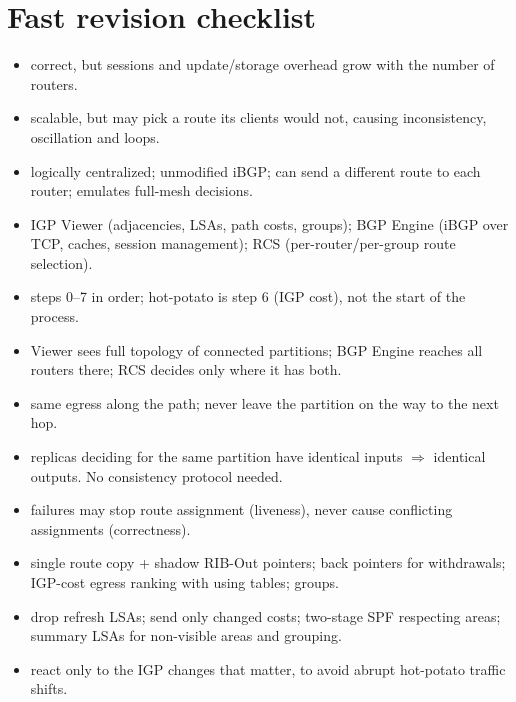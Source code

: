 \section{Fast revision checklist}
\begin{itemize}
\item {} correct, but sessions and update/storage overhead grow with the number of routers.
\item {} scalable, but may pick a route its clients would not, causing inconsistency, oscillation and loops.
\item {} logically centralized; unmodified iBGP; can send a different route to each router; emulates full-mesh decisions.
\item {} IGP Viewer (adjacencies, LSAs, path costs, groups); BGP Engine (iBGP over TCP, caches, session management); RCS (per-router/per-group route selection).
\item {} steps 0--7 in order; hot-potato is step 6 (IGP cost), not the start of the process.
\item {} Viewer sees full topology of connected partitions; BGP Engine reaches all routers there; RCS decides only where it has both.
\item {} same egress along the path; never leave the partition on the way to the next hop.
\item {} replicas deciding for the same partition have identical inputs $\Rightarrow$ identical outputs. No consistency protocol needed.
\item {} failures may stop route assignment (liveness), never cause conflicting assignments (correctness).
\item {} single route copy + shadow RIB-Out pointers; back pointers for withdrawals; IGP-cost egress ranking with using tables; groups.
\item {} drop refresh LSAs; send only changed costs; two-stage SPF respecting areas; summary LSAs for non-visible areas and grouping.
\item {} react only to the IGP changes that matter, to avoid abrupt hot-potato traffic shifts.
\end{itemize}
